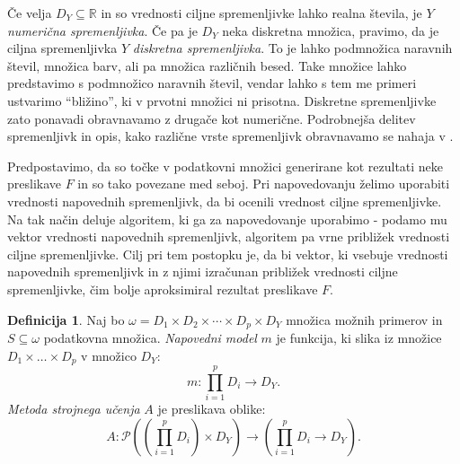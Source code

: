 \documentclass[12pt,a4paper,twoside]{article}
\theoremstyle{definition} %
\newtheorem{definicija}{Definicija}[section]
\theoremstyle{plain} %
\numberwithin{equation}{section}  %
\newcommand{\R}{\mathbb R}
\begin{document}
Če velja $D_Y \subseteq \R$ in so vrednosti ciljne spremenljivke lahko realna števila, je $Y$ \emph{numerična spremenljivka}.
Če pa je $D_Y$ neka diskretna množica, pravimo, da je ciljna spremenljivka $Y$ \emph{diskretna spremenljivka}.
To je lahko podmnožica naravnih števil, množica barv, ali pa množica različnih besed. 
Take množice lahko predstavimo s podmnožico naravnih števil, vendar lahko s tem me primeri ustvarimo ``bližino'', ki v prvotni množici ni prisotna. 
Diskretne spremenljivke zato ponavadi obravnavamo z drugače kot numerične.
Podrobnejša delitev spremenljivk in opis, kako različne vrste spremenljivk obravnavamo se nahaja v \cite[pogl. 10]{flach2012machine}.


Predpostavimo, da so točke v podatkovni množici generirane kot rezultati neke preslikave $F$ in so tako povezane med seboj.
Pri napovedovanju želimo uporabiti vrednosti napovednih spremenljivk, da bi ocenili vrednost ciljne spremenljivke.
Na tak način deluje algoritem, ki ga za napovedovanje uporabimo - podamo mu vektor vrednosti napovednih spremenljivk, algoritem pa vrne približek vrednosti ciljne spremenljivke.
Cilj pri tem postopku je, da bi vektor, ki vsebuje vrednosti napovednih spremenljivk in z njimi izračunan približek vrednosti ciljne spremenljivke, čim bolje aproksimiral rezultat preslikave $F$.

\begin{definicija}
\label{def:model_metoda}
	Naj bo $\omega = D_1 \times D_2 \times \cdots \times D_p \times D_Y$ množica možnih primerov in $S \subseteq \omega$ podatkovna množica.
	\emph{Napovedni model} $m$ je funkcija, ki slika iz množice $D_1 \times \ldots \times D_p$ v množico $D_Y$:
	\[
	m: \prod_{i=1}^p D_i \rightarrow D_Y.
	\]
	\emph{Metoda strojnega učenja} $A$ je preslikava oblike:
	\[
	A: \mathcal{P} \left( \left(\prod_{i=1}^p D_i \right) \times D_Y \right) \rightarrow \left(\prod_{i=1}^p D_i \rightarrow D_Y \right).
	\]
\end{definicija}

\end{document}
